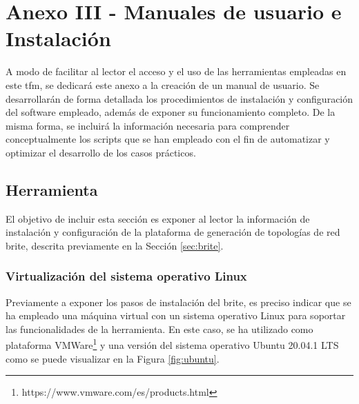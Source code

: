 \chapter{Anexo III - Manuales de usuario e Instalación}

A modo de facilitar al lector el acceso y el uso de las herramientas empleadas en este \gls{tfm}, se dedicará este anexo a la creación de un manual de usuario. Se desarrollarán de forma detallada los procedimientos de instalación y configuración del software empleado, además de exponer su funcionamiento completo. De la misma forma, se incluirá la información necesaria para comprender conceptualmente los scripts que se han empleado con el fin de automatizar y optimizar el desarrollo de los casos prácticos.




\section{Herramienta }
\label{sec:manualbrite}

El objetivo de incluir esta sección es exponer al lector la información de instalación y configuración de la plataforma de generación de topologías de red \gls{brite}, descrita previamente en la Sección \ref{sec:brite}.

\subsection{Virtualización del sistema operativo Linux}
Previamente a exponer los pasos de instalación del \gls{brite}, es preciso indicar que se ha empleado una máquina virtual con un sistema operativo Linux para soportar las funcionalidades de la herramienta. En este caso, se ha utilizado como plataforma VMWare\footnote{https://www.vmware.com/es/products.html} y una versión del sistema operativo Ubuntu 20.04.1 LTS como se puede visualizar en la Figura \ref{fig:ubuntu}.

